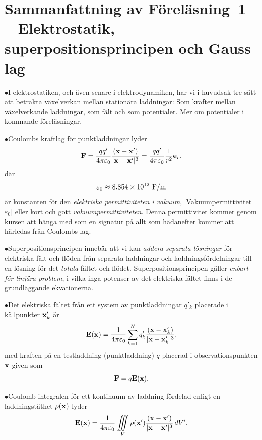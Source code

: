 \section{Sammanfattning av F{\"o}rel{\"a}sning~1 -- Elektrostatik,
  superpositionsprincipen och Gauss lag}
\item{$\bullet$}{I elektrostatiken, och {\"a}ven senare i elektrodynamiken,
  har vi i huvudsak tre s{\"a}tt att betrakta v{\"a}xelverkan mellan
  station{\"a}ra laddningar: Som krafter mellan v{\"a}xelverkande laddningar,
  som f{\"a}lt och som potentialer. Mer om potentialer i kommande
  f{\"o}rel{\"a}sningar.}
\item{$\bullet$}{Coulombs kraftlag f{\"o}r punktladdningar lyder
  $$
    {\bf F}
      ={{qq'}\over{4\pi\varepsilon_0}}
        {{({\bf x}-{\bf x}')}\over{|{\bf x}-{\bf x}'|^3}}
      ={{qq'}\over{4\pi\varepsilon_0}}{{1}\over{r^2}}{\bf e}_r,
  $$
  d{\"a}r
  $$
    \varepsilon_0\approx8.854\times10^{12}\ {\rm F}/{\rm m}
  $$
  {\"a}r konstanten f{\"o}r den {\it elektriska permittiviteten i
  vakuum}, [Vakuumpermittivitet $\varepsilon_0$]
  eller kort och gott {\it vakuumpermittiviteten}. Denna permittivitet
  kommer genom kursen att h{\"a}nga med som en signatur p{\aa} allt som
  h{\"a}danefter kommer att h{\"a}rledas fr{\aa}n Coulombs lag.}
\item{$\bullet$}{Superpositionsprincipen inneb{\"a}r att vi kan
  {\it addera separata l{\"o}sningar} f{\"o}r elektriska f{\"a}lt
  och fl{\"o}den fr{\aa}n separata laddningar och laddningsf{\"o}rdelningar
  till en l{\"o}sning f{\"o}r det {\it totala} f{\"a}ltet och fl{\"o}det.
  Superpositionsprincipen g{\"a}ller {\it enbart f{\"o}r linj{\"a}ra
  problem}, i vilka inga potenser av det elektriska f{\"a}ltet finns
  i de grund\-l{\"a}ggande ekvationerna.}
\item{$\bullet$}{Det elektriska f{\"a}ltet fr{\aa}n ett system av
  punktladdningar $q'_k$ placerade i k{\"a}llpunkter ${\bf x}'_k$ {\"a}r
  $$
    {\bf E}({\bf x})={{1}\over{4\pi\varepsilon_0}}\sum^N_{k=1}
       q'_k {{({\bf x}-{\bf x}'_k)}\over{|{\bf x}-{\bf x}'_k|^3}},
  $$
  med kraften p{\aa} en testladdning (punktladdning) $q$ placerad i
  observationspunkten ${\bf x}$ given som
  $$
    {\bf F}=q{\bf E}({\bf x}).
  $$}
\item{$\bullet$}{Coulomb-integralen f{\"o}r ett kontinuum av laddning
  f{\"o}rdelad enligt en laddningst{\"a}thet $\rho({\bf x})$ lyder
  $$
    {\bf E}({\bf x})={{1}\over{4\pi\varepsilon_0}}\iiint_V\rho({\bf x}')
      {{({\bf x}-{\bf x}')}\over{|{\bf x}-{\bf x}'|^3}}\,dV'.
  $$}
